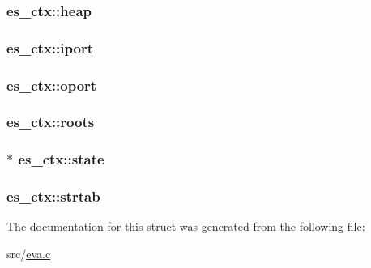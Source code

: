 \hypertarget{structes__ctx_a4bda0f41bebf5e45f30ad5acb16630cd}{
\subsubsection[{heap}]{ es\-\_\-ctx\-::heap}}\label{structes__ctx_a4bda0f41bebf5e45f30ad5acb16630cd}
\hypertarget{structes__ctx_a0a5e82922de3d23cdfe1bd9cc9a04f44}{
\subsubsection[{iport}]{ es\-\_\-ctx\-::iport}}\label{structes__ctx_a0a5e82922de3d23cdfe1bd9cc9a04f44}
\hypertarget{structes__ctx_ab6d272d37e3f64bb7b7c69b273636993}{
\subsubsection[{oport}]{ es\-\_\-ctx\-::oport}}\label{structes__ctx_ab6d272d37e3f64bb7b7c69b273636993}
\hypertarget{structes__ctx_a28a5b0f651f7f32bb77cb6b017ecfc5a}{
\subsubsection[{roots}]{ es\-\_\-ctx\-::roots}}\label{structes__ctx_a28a5b0f651f7f32bb77cb6b017ecfc5a}
\hypertarget{structes__ctx_a15e682b2a1451b0337f2fbf87d0c3682}{
\subsubsection[{state}]{$\ast$ es\-\_\-ctx\-::state}}\label{structes__ctx_a15e682b2a1451b0337f2fbf87d0c3682}
\hypertarget{structes__ctx_af20902707356055f32385c19395c1892}{
\subsubsection[{strtab}]{ es\-\_\-ctx\-::strtab}}\label{structes__ctx_af20902707356055f32385c19395c1892}


The documentation for this struct was generated from the following file\-:\begin{DoxyCompactItemize}
\item 
src/\hyperlink{eva_8c}{eva.\-c}\end{DoxyCompactItemize}
